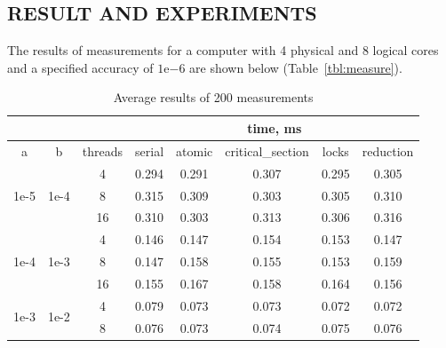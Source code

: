 \subsection{RESULT AND EXPERIMENTS}\label{subsec:result_exp}

The results of measurements for a computer with 4 physical and 8 logical cores and a specified accuracy of $1\mathrm{e}{-6}$ are shown below (Table~\ref{tbl:measure}).

\begin{table}[H]
\caption{Average results of 200 measurements}
\begin{tabular}{ccc|c|c|c|c|c|}
\cline{4-8}
                                            &                                            &         & \multicolumn{5}{c|}{time, ms}                           \\ \hline
\multicolumn{1}{|c|}{a}                     & \multicolumn{1}{c|}{b}                     & threads & serial & atomic & critical\_section & locks & reduction \\ \hline
\multicolumn{1}{|c|}{\multirow{3}{*}{1e-5}} & \multicolumn{1}{c|}{\multirow{3}{*}{1e-4}} & 4       & 0.294  & 0.291  & 0.307             & 0.295 & 0.305     \\ \cline{3-8}
\multicolumn{1}{|c|}{}                      & \multicolumn{1}{c|}{}                      & 8       & 0.315  & 0.309  & 0.303             & 0.305 & 0.310     \\ \cline{3-8}
\multicolumn{1}{|c|}{}                      & \multicolumn{1}{c|}{}                      & 16      & 0.310  & 0.303  & 0.313             & 0.306 & 0.316     \\ \hline
\multicolumn{1}{|c|}{\multirow{3}{*}{1e-4}} & \multicolumn{1}{c|}{\multirow{3}{*}{1e-3}} & 4       & 0.146  & 0.147  & 0.154             & 0.153 & 0.147     \\ \cline{3-8}
\multicolumn{1}{|c|}{}                      & \multicolumn{1}{c|}{}                      & 8       & 0.147  & 0.158  & 0.155             & 0.153 & 0.159     \\ \cline{3-8}
\multicolumn{1}{|c|}{}                      & \multicolumn{1}{c|}{}                      & 16      & 0.155  & 0.167  & 0.158             & 0.164 & 0.156     \\ \hline
\multicolumn{1}{|c|}{\multirow{3}{*}{1e-3}} & \multicolumn{1}{c|}{\multirow{3}{*}{1e-2}} & 4       & 0.079  & 0.073  & 0.073             & 0.072 & 0.072     \\ \cline{3-8}
\multicolumn{1}{|c|}{}                      & \multicolumn{1}{c|}{}                      & 8       & 0.076  & 0.073  & 0.074             & 0.075 & 0.076     \\ \cline{3-8}

\end{tabular}
\end{table}
